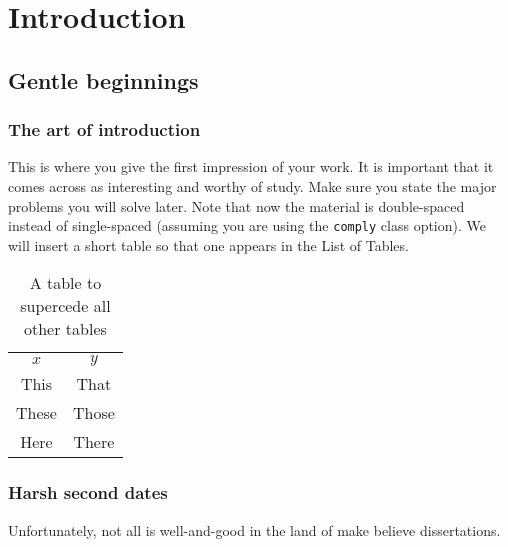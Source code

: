\chapter{Introduction}
\label{cha:introduction}

\section{Gentle beginnings}

\subsection{The art of introduction}

This is where you give the first  impression of your work. 
It is important that it comes across as interesting and worthy of study. 
Make sure you state the major problems you will solve later.
Note that now the material is double-spaced instead of single-spaced (assuming you are using the \verb+comply+ class option).
We will insert a short table so that one appears in the List of Tables.

\begin{table}[h]
  \centering
  \begin{tabular}{c|c}
    $x$ & $y$ \\
    This & That \\
    These & Those \\
    Here & There \\
  \end{tabular}
  \caption{A table to supercede all other tables}
  \label{tab:supercession}
\end{table}

\newpage

\subsection{Harsh second dates}

Unfortunately, not all is well-and-good in the land of make believe dissertations.



